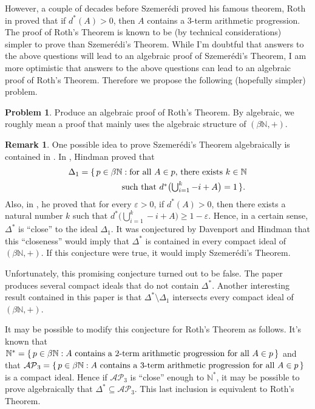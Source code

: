 \documentclass[12pt]{article}
\theoremstyle{plain}
\theoremstyle{definition}
\newtheorem{rmk}[thm]{Remark}
\newtheorem{prob}[thm]{Problem}
\newcommand{\bbN}{\mathbb{N}}
\begin{document}
However, a couple of decades before Szemer\'{e}di proved his famous
theorem, Roth in \cite{Roth:1953fk} proved that if $d^*(A) > 0$, then
$A$ contains a 3-term arithmetic progression. 
The proof of Roth's Theorem is known to be (by technical
considerations) simpler to prove than Szemer\'{e}di's Theorem. 
While I'm doubtful that answers to the above questions will lead to an
algebraic proof of Szemer\'{e}di's Theorem, I am more optimistic that
answers to the above questions can lead to an algebraic proof of
Roth's Theorem.
Therefore we propose the following (hopefully simpler) problem.
\begin{prob}
  Produce an algebraic proof of Roth's Theorem.
  By algebraic, we roughly mean a proof that mainly uses the
  algebraic structure of $(\beta\bbN, +)$. 
\end{prob}
\begin{rmk}
  One possible idea to prove Szemer\'{e}di's Theorem algebraically is
  contained in \cite{Davenport:1987uq}.  
  In \cite[Theorem 3.8]{Hindman:1982zr}, Hindman proved that 
  \begin{align*}
    \Delta_1 &= \{\, p \in \beta\bbN: \hbox{for all $A \in p$, there
      exists $k \in \bbN$} \\
      &\hspace{5em}\hbox{such that $d^*\bigl(\bigcup_{i=1}^k
        -i+A\bigr) = 1$} \,\}.
  \end{align*}
  Also, in \cite[Theorem 3.8]{Hindman:1982fk}, he proved that for
  every $\varepsilon >0$, if $d^*(A) > 0$, then there exists a natural
  number $k$ such that $d^*\bigl(\bigcup_{i=1}^k -i+A \bigr) \ge 1 -
  \varepsilon$. 
  Hence, in a certain sense, $\Delta^*$ is ``close'' to the ideal
  $\Delta_1$. 
  It was conjectured by Davenport and Hindman that this ``closeness''
  would imply that $\Delta^*$ is contained in every compact ideal of
  $(\beta\bbN, +)$. 
  If this conjecture were true, it would imply Szemer\'{e}di's
  Theorem. 
  
  Unfortunately, this promising conjecture turned out to be
  false. 
  The paper \cite{Davenport:1987uq} produces several compact ideals
  that do not contain $\Delta^*$. 
  Another interesting result contained in this paper is that
  $\Delta^*\setminus\Delta_1$ intersects every compact ideal of
  $(\beta\bbN, +)$.

  It may be possible to modify this conjecture for Roth's Theorem as
  follows. 
  It's known that $\bbN^* = \{\, p \in \beta\bbN : \hbox{$A$ contains
    a 2-term arithmetic progression for all $A \in p$} \,\}$ and that
  $\mathcal{AP}_3 = \{\, p \in \beta\bbN : \hbox{$A$ contains a }
  \hbox{3-term arithmetic progression for all $A \in p$} \,\}$ is a
  compact ideal.
  Hence if $\mathcal{AP}_3$ is ``close'' enough to $\bbN^*$, it may be
  possible to prove algebraically that $\Delta^* \subseteq
  \mathcal{AP}_3$. 
  This last inclusion is equivalent to Roth's Theorem.
\end{rmk}
\end{document}
